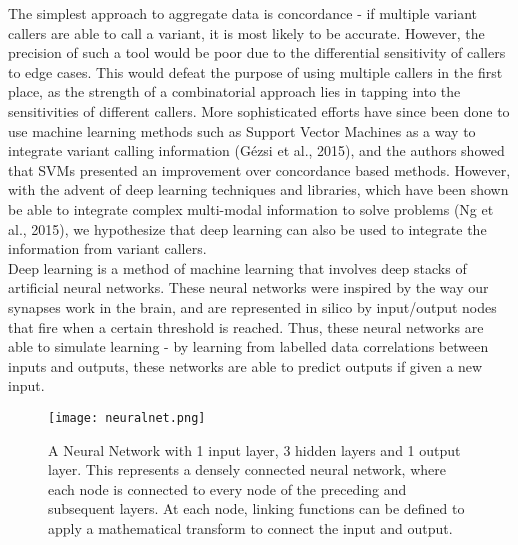\documentclass{article}
\begin{document}
The simplest approach to aggregate data is concordance - if multiple variant callers are able to call a variant, it is most likely to be accurate. However, the precision of such a tool would be poor due to the differential sensitivity of callers to edge cases. This would defeat the purpose of using multiple callers in the first place, as the strength of a combinatorial approach lies in tapping into the sensitivities of different callers. More sophisticated efforts have since been done to use machine learning methods such as Support Vector Machines as a way to integrate variant calling information (Gézsi et al., 2015), and the authors showed that SVMs presented an improvement over concordance based methods. However, with the advent of deep learning techniques and libraries, which have been shown be able to integrate complex multi-modal information to solve problems (Ng et al., 2015), we hypothesize that deep learning can also be used to integrate the information from variant callers.\\

Deep learning is a method of machine learning that involves deep stacks of artificial neural networks. These neural networks were inspired by the way our synapses work in the brain, and are represented in silico by input/output nodes that fire when a certain threshold is reached. Thus, these neural networks are able to simulate learning - by learning from labelled data correlations between inputs and outputs, these networks are able to predict outputs if given a new input. 

\begin{figure}[H]
\texttt{[image: neuralnet.png]}
\centering
\caption{A Neural Network with 1 input layer, 3 hidden layers and 1 output layer. This represents a densely connected neural network, where each node is connected to every node of the preceding and subsequent layers. At each node, linking functions can be defined to apply a mathematical transform to connect the input and output.}
\end{figure}
\end{document}
